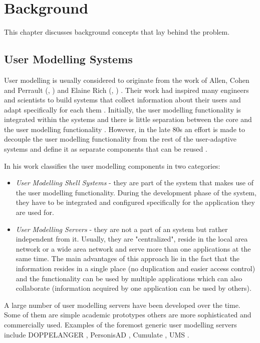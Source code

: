 
\chapter{\label{cha:background}Background}
This chapter discusses background concepts that lay behind the problem.

\section{User Modelling Systems}

User modelling is usually considered to originate from the work of Allen, Cohen and Perrault (\cite{allen1979plan}, \cite{cohen1979elements}) and Elaine Rich (\cite{rich1979building}, \cite{rich1979user}) \cite{kobsa2001generic}. Their work had inspired many engineers and scientists to build systems that collect information about their users and adapt specifically for each them \cite{wahlster1989user}. Initially, the user modelling functionality is integrated within the systems and there is little separation between the core and the user modelling functionality \cite{kobsa2001generic}. However, in the late 80s an effort is made to decouple the user modelling functionality from the rest of the user-adaptive systems and define it as separate components that can be reused \cite{kobsa2001generic}. 

In his work \cite{kobsa2001generic} classifies the user modelling components in two categories:
\begin{itemize}
	\item \textit{User Modelling Shell Systems} - they are part of the system that makes use of the user modelling functionality. During the development phase of the system, they have to be integrated and configured specifically for the application they are used for.
	\item \textit{User Modelling Servers} - they are not a part of an system but rather independent from it. Usually, they are "centralized", reside in the local area network or a wide area network and serve more than one applications at the same time. The main advantages of this approach lie in the fact that the information resides in a single place (no duplication and easier access control) and the functionality can be used by multiple applications which can also collaborate (information acquired by one application can be used by others).
\end{itemize}

A large number of user modelling servers have been developed over the time. Some of them are simple academic prototypes others are more sophisticated and commercially used. Examples of the foremost generic user modelling servers include DOPPELANGER \cite{orwant1994heterogeneous}, PersonisAD \cite{assad2007personisad}, Cumulate \cite{brusilovsky2004knowledgetree}, UMS \cite{kobsa2006ldap}.

